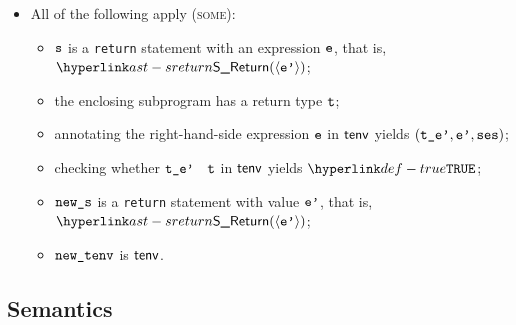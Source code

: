 \begin{itemize}
  \item All of the following apply (\textsc{some}):
  \begin{itemize}
    \item $\vs$ is a \texttt{return} statement with an expression $\ve$, that is, $\SReturn(\langle \vep \rangle)$;
    \item the enclosing subprogram has a return type $\vt$;
    \item annotating the right-hand-side expression $\ve$ in $\tenv$ yields $(\tep,\vep,\vses)$\ProseOrTypeError;
    \item checking whether $\vtep$ \typesatisfies\ $\vt$ in $\tenv$ yields $\True$\ProseOrTypeError;
    \item $\news$ is a \texttt{return} statement with value $\vep$, that is, $\SReturn(\langle \vep \rangle)$;
    \item $\newtenv$ is $\tenv$.
  \end{itemize}
\end{itemize}
\FormallyParagraph
\begin{mathpar}
\end{mathpar}

\begin{mathpar}
\end{mathpar}

\begin{mathpar}
\end{mathpar}

\subsection{Semantics}
